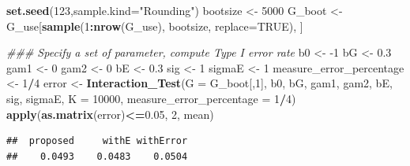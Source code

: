 \documentclass[
]{article}
\newenvironment{Shaded}{\begin{snugshade}}{\end{snugshade}}
\newcommand{\CommentTok}[1]{\textcolor[rgb]{0.56,0.35,0.01}{\textit{#1}}}
\newcommand{\DataTypeTok}[1]{\textcolor[rgb]{0.13,0.29,0.53}{#1}}
\newcommand{\DecValTok}[1]{\textcolor[rgb]{0.00,0.00,0.81}{#1}}
\newcommand{\FloatTok}[1]{\textcolor[rgb]{0.00,0.00,0.81}{#1}}
\newcommand{\KeywordTok}[1]{\textcolor[rgb]{0.13,0.29,0.53}{\textbf{#1}}}
\newcommand{\NormalTok}[1]{#1}
\newcommand{\OperatorTok}[1]{\textcolor[rgb]{0.81,0.36,0.00}{\textbf{#1}}}
\newcommand{\OtherTok}[1]{\textcolor[rgb]{0.56,0.35,0.01}{#1}}
\newcommand{\StringTok}[1]{\textcolor[rgb]{0.31,0.60,0.02}{#1}}
\begin{document}
\begin{Shaded}
\begin{Highlighting}[]
\KeywordTok{set.seed}\NormalTok{(}\DecValTok{123}\NormalTok{,}\DataTypeTok{sample.kind=}\StringTok{"Rounding"}\NormalTok{)}
\NormalTok{bootsize <-}\StringTok{ }\DecValTok{5000}
\NormalTok{G_boot <-}\StringTok{ }\NormalTok{G_use[}\KeywordTok{sample}\NormalTok{(}\DecValTok{1}\OperatorTok{:}\KeywordTok{nrow}\NormalTok{(G_use), bootsize, }\DataTypeTok{replace=}\OtherTok{TRUE}\NormalTok{), ]}

\CommentTok{### Specify a set of parameter, compute Type I error rate}
\NormalTok{b0 <-}\StringTok{ }\DecValTok{-1}
\NormalTok{bG <-}\StringTok{ }\FloatTok{0.3}
\NormalTok{gam1 <-}\StringTok{ }\DecValTok{0}
\NormalTok{gam2 <-}\StringTok{ }\DecValTok{0}
\NormalTok{bE <-}\StringTok{ }\FloatTok{0.3}
\NormalTok{sig <-}\StringTok{ }\DecValTok{1}
\NormalTok{sigmaE <-}\StringTok{ }\DecValTok{1}
\NormalTok{measure_error_percentage <-}\StringTok{ }\DecValTok{1}\OperatorTok{/}\DecValTok{4}
\NormalTok{error <-}\StringTok{ }\KeywordTok{Interaction_Test}\NormalTok{(}\DataTypeTok{G =}\NormalTok{ G_boot[,}\DecValTok{1}\NormalTok{], b0, bG, gam1, gam2, bE, sig, sigmaE, }\DataTypeTok{K =} \DecValTok{10000}\NormalTok{, }\DataTypeTok{measure_error_percentage =} \DecValTok{1}\OperatorTok{/}\DecValTok{4}\NormalTok{)}
\KeywordTok{apply}\NormalTok{(}\KeywordTok{as.matrix}\NormalTok{(error)}\OperatorTok{<=}\FloatTok{0.05}\NormalTok{, }\DecValTok{2}\NormalTok{, mean)}
\end{Highlighting}
\end{Shaded}

\begin{verbatim}
##  proposed     withE withError 
##    0.0493    0.0483    0.0504
\end{verbatim}

\begin{Shaded}
\end{Shaded}
\end{document}
